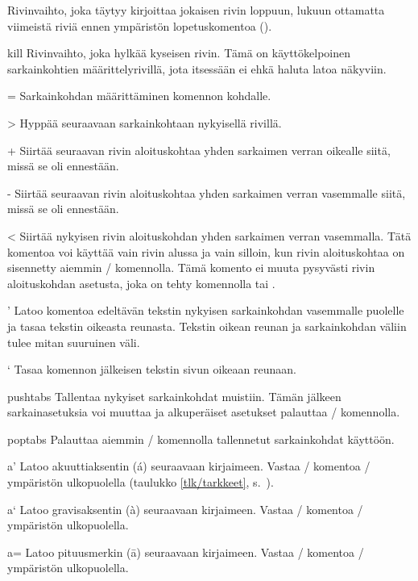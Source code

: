 \begin{maaritelma}{}
\item [\keno] Rivinvaihto, joka täytyy kirjoittaa jokaisen rivin
  loppuun, lukuun ottamatta viimeistä riviä ennen ympäristön
  lopetuskomentoa ().
\item [kill] Rivinvaihto, joka hylkää kyseisen rivin. Tämä on
  käyttökelpoinen sarkainkohtien määrittelyrivillä, jota itsessään ei
  ehkä haluta latoa näkyviin.
\item [=] Sarkainkohdan määrittäminen komennon kohdalle.
\item [>] Hyppää seuraavaan sarkainkohtaan nykyisellä rivillä.
\item [+] Siirtää seuraavan rivin aloituskohtaa yhden sarkaimen verran
  oikealle siitä, missä se oli ennestään.
\item [-] Siirtää seuraavan rivin aloituskohtaa yhden sarkaimen verran
  vasemmalle siitä, missä se oli ennestään.
\item [<] Siirtää nykyisen rivin aloituskohdan yhden sarkaimen verran
  vasemmalla. Tätä komentoa voi käyttää vain rivin alussa ja vain
  silloin, kun rivin aloituskohtaa on sisennetty aiemmin \komento{+}\-/
  komennolla. Tämä komento ei muuta pysyvästi rivin aloituskohdan
  asetusta, joka on tehty komennolla \komento{+} tai \komento{-}.
\item ['] Latoo komentoa edeltävän tekstin nykyisen sarkainkohdan
  vasemmalle puolelle ja tasaa tekstin oikeasta reunasta. Tekstin oikean
  reunan ja sarkainkohdan väliin tulee mitan 
  suuruinen väli.
\item [`] Tasaa komennon jälkeisen tekstin sivun oikeaan reunaan.
\item [pushtabs] Tallentaa nykyiset sarkainkohdat muistiin. Tämän
  jälkeen sarkainasetuksia voi muuttaa ja alkuperäiset asetukset
  palauttaa \-/ komennolla.
\item [poptabs] Palauttaa aiemmin \-/ komennolla
  tallennetut sarkainkohdat käyttöön.
\item [a'] Latoo akuuttiaksentin (\'a) seuraavaan kirjaimeen. Vastaa
  \-/ komentoa \-/ ympäristön ulkopuolella
  (taulukko \ref{tlk/tarkkeet}, s.~\pageref{tlk/tarkkeet}).
\item [a`] Latoo gravisaksentin (\`a) seuraavaan kirjaimeen. Vastaa
  \-/ komentoa \-/ ympäristön
  ulkopuolella.
\item [a=] Latoo pituusmerkin (\=a) seuraavaan kirjaimeen. Vastaa
  \komento{=}\-/ komentoa \-/ ympäristön
  ulkopuolella.
\end{maaritelma}

